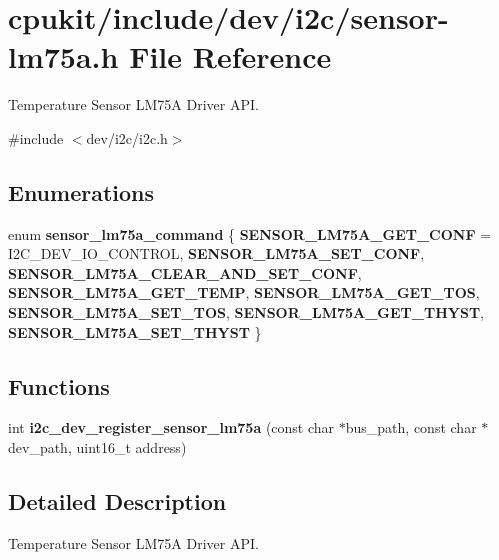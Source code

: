 \hypertarget{sensor-lm75a_8h}{}\section{cpukit/include/dev/i2c/sensor-\/lm75a.h File Reference}
\label{sensor-lm75a_8h}


Temperature Sensor L\+M75A Driver A\+PI.  


{\ttfamily \#include $<$dev/i2c/i2c.\+h$>$}\newline
\subsection*{Enumerations}
\begin{DoxyCompactItemize}
\item 
\mbox{\label{group__I2CSensorLM75A_ga34fad634a819614142c409f118d0335c}} 
enum {\bfseries sensor\+\_\+lm75a\+\_\+command} \{ \newline
{\bfseries S\+E\+N\+S\+O\+R\+\_\+\+L\+M75\+A\+\_\+\+G\+E\+T\+\_\+\+C\+O\+NF} = I2\+C\+\_\+\+D\+E\+V\+\_\+\+I\+O\+\_\+\+C\+O\+N\+T\+R\+OL, 
{\bfseries S\+E\+N\+S\+O\+R\+\_\+\+L\+M75\+A\+\_\+\+S\+E\+T\+\_\+\+C\+O\+NF}, 
{\bfseries S\+E\+N\+S\+O\+R\+\_\+\+L\+M75\+A\+\_\+\+C\+L\+E\+A\+R\+\_\+\+A\+N\+D\+\_\+\+S\+E\+T\+\_\+\+C\+O\+NF}, 
{\bfseries S\+E\+N\+S\+O\+R\+\_\+\+L\+M75\+A\+\_\+\+G\+E\+T\+\_\+\+T\+E\+MP}, 
\newline
{\bfseries S\+E\+N\+S\+O\+R\+\_\+\+L\+M75\+A\+\_\+\+G\+E\+T\+\_\+\+T\+OS}, 
{\bfseries S\+E\+N\+S\+O\+R\+\_\+\+L\+M75\+A\+\_\+\+S\+E\+T\+\_\+\+T\+OS}, 
{\bfseries S\+E\+N\+S\+O\+R\+\_\+\+L\+M75\+A\+\_\+\+G\+E\+T\+\_\+\+T\+H\+Y\+ST}, 
{\bfseries S\+E\+N\+S\+O\+R\+\_\+\+L\+M75\+A\+\_\+\+S\+E\+T\+\_\+\+T\+H\+Y\+ST}
 \}
\end{DoxyCompactItemize}
\subsection*{Functions}
\begin{DoxyCompactItemize}
\item 
int {\bfseries i2c\+\_\+dev\+\_\+register\+\_\+sensor\+\_\+lm75a} (const char $\ast$bus\+\_\+path, const char $\ast$dev\+\_\+path, uint16\+\_\+t address)
\end{DoxyCompactItemize}


\subsection{Detailed Description}
Temperature Sensor L\+M75A Driver A\+PI. 

